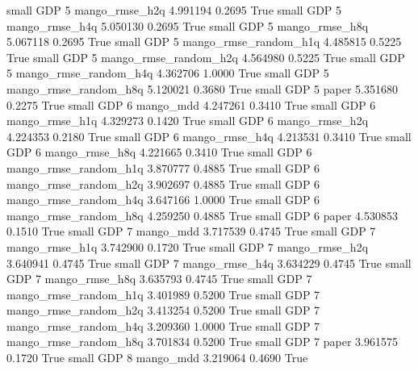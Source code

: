      small      GDP                 5        mango_rmse_h2q   4.991194      0.2695    True
     small      GDP                 5        mango_rmse_h4q   5.050130      0.2695    True
     small      GDP                 5        mango_rmse_h8q   5.067118      0.2695    True
     small      GDP                 5 mango_rmse_random_h1q   4.485815      0.5225    True
     small      GDP                 5 mango_rmse_random_h2q   4.564980      0.5225    True
     small      GDP                 5 mango_rmse_random_h4q   4.362706      1.0000    True
     small      GDP                 5 mango_rmse_random_h8q   5.120021      0.3680    True
     small      GDP                 5                 paper   5.351680      0.2275    True
     small      GDP                 6             mango_mdd   4.247261      0.3410    True
     small      GDP                 6        mango_rmse_h1q   4.329273      0.1420    True
     small      GDP                 6        mango_rmse_h2q   4.224353      0.2180    True
     small      GDP                 6        mango_rmse_h4q   4.213531      0.3410    True
     small      GDP                 6        mango_rmse_h8q   4.221665      0.3410    True
     small      GDP                 6 mango_rmse_random_h1q   3.870777      0.4885    True
     small      GDP                 6 mango_rmse_random_h2q   3.902697      0.4885    True
     small      GDP                 6 mango_rmse_random_h4q   3.647166      1.0000    True
     small      GDP                 6 mango_rmse_random_h8q   4.259250      0.4885    True
     small      GDP                 6                 paper   4.530853      0.1510    True
     small      GDP                 7             mango_mdd   3.717539      0.4745    True
     small      GDP                 7        mango_rmse_h1q   3.742900      0.1720    True
     small      GDP                 7        mango_rmse_h2q   3.640941      0.4745    True
     small      GDP                 7        mango_rmse_h4q   3.634229      0.4745    True
     small      GDP                 7        mango_rmse_h8q   3.635793      0.4745    True
     small      GDP                 7 mango_rmse_random_h1q   3.401989      0.5200    True
     small      GDP                 7 mango_rmse_random_h2q   3.413254      0.5200    True
     small      GDP                 7 mango_rmse_random_h4q   3.209360      1.0000    True
     small      GDP                 7 mango_rmse_random_h8q   3.701834      0.5200    True
     small      GDP                 7                 paper   3.961575      0.1720    True
     small      GDP                 8             mango_mdd   3.219064      0.4690    True
